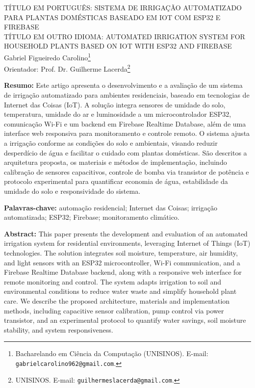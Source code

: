 \documentclass[twoside,english,brazilian]{UNISINOSmonografia}
\begin{document}
\capa
\folhaderosto

\clearpage
\thispagestyle{plain}
\begin{center}
\MakeUppercase{TÍTULO EM PORTUGUÊS: Sistema de Irrigação Automatizado para Plantas Domésticas baseado em IoT com ESP32 e Firebase}\\[0.75em]
\MakeUppercase{TÍTULO EM OUTRO IDIOMA: Automated Irrigation System for Household Plants based on IoT with ESP32 and Firebase}\\[1.5em]

Gabriel Figueiredo Carolino\footnote{Bacharelando em Ciência da Computação (UNISINOS). E-mail: \texttt{gabrielcarolino962@gmail.com}.} \\
Orientador: Prof. Dr. Guilherme Lacerda\footnote{UNISINOS. E-mail: \texttt{guilhermeslacerda@gmail.com}.}
\end{center}

\bigskip

\noindent\textbf{Resumo:} Este artigo apresenta o desenvolvimento e a avaliação de um sistema de irrigação automatizado para ambientes residenciais, baseado em tecnologias de Internet das Coisas (IoT). A solução integra sensores de umidade do solo, temperatura, umidade do ar e luminosidade a um microcontrolador ESP32, comunicação Wi-Fi e um backend em Firebase Realtime Database, além de uma interface web responsiva para monitoramento e controle remoto. O sistema ajusta a irrigação conforme as condições do solo e ambientais, visando reduzir desperdício de água e facilitar o cuidado com plantas domésticas. São descritos a arquitetura proposta, os materiais e métodos de implementação, incluindo calibração de sensores capacitivos, controle de bomba via transistor de potência e protocolo experimental para quantificar economia de água, estabilidade da umidade do solo e responsividade do sistema.

\medskip
\noindent\textbf{Palavras-chave:} automação residencial; Internet das Coisas; irrigação automatizada; ESP32; Firebase; monitoramento climático.

\medskip
\noindent\textbf{Abstract:} This paper presents the development and evaluation of an automated irrigation system for residential environments, leveraging Internet of Things (IoT) technologies. The solution integrates soil moisture, temperature, air humidity, and light sensors with an ESP32 microcontroller, Wi-Fi communication, and a Firebase Realtime Database backend, along with a responsive web interface for remote monitoring and control. The system adapts irrigation to soil and environmental conditions to reduce water waste and simplify household plant care. We describe the proposed architecture, materials and implementation methods, including capacitive sensor calibration, pump control via power transistor, and an experimental protocol to quantify water savings, soil moisture stability, and system responsiveness.
\end{document}
